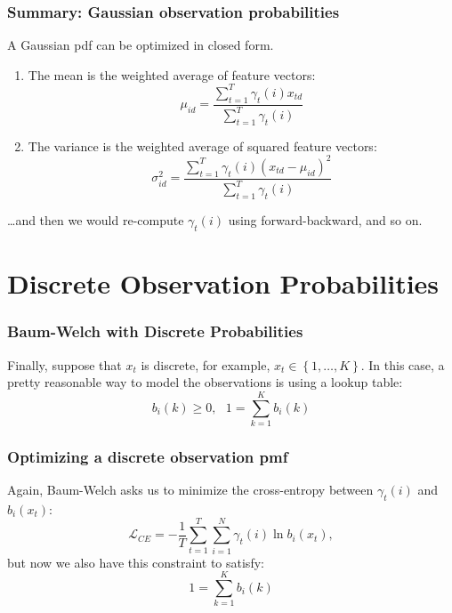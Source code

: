 \documentclass{beamer}
\begin{document}
\begin{frame}
  \frametitle{Summary: Gaussian observation probabilities}

  A Gaussian pdf can be optimized in closed form.
  \begin{enumerate}
  \item The mean is the weighted average of feature vectors:
    \begin{displaymath}
      \mu_{id} = \frac{\sum_{t=1}^T\gamma_t(i)x_{td}}{\sum_{t=1}^T\gamma_t(i)}
    \end{displaymath}
  \item The variance is the weighted average of squared feature vectors:
    \begin{displaymath}
      \sigma_{id}^2 = \frac{\sum_{t=1}^T\gamma_t(i)(x_{td}-\mu_{id})^2}{\sum_{t=1}^T\gamma_t(i)}
    \end{displaymath}
  \end{enumerate}
  \ldots and then we would re-compute $\gamma_t(i)$ using
  forward-backward, and so on.
\end{frame}

\section[Discrete]{Discrete Observation Probabilities}
\setcounter{subsection}{1}

\begin{frame}
  \frametitle{Baum-Welch with Discrete Probabilities}

  Finally, suppose that $x_t$ is discrete, for example,
  $x_t\in\left\{1,\ldots,K\right\}$.  In this case, a pretty
  reasonable way to model the observations is using a lookup table:
  \begin{displaymath}
  b_i(k)\ge 0,~~~1=\sum_{k=1}^K b_i(k)
  \end{displaymath}
\end{frame}

\begin{frame}
  \frametitle{Optimizing a discrete observation pmf}
  
  Again, Baum-Welch asks us to minimize the
  cross-entropy between $\gamma_t(i)$ and $b_i(x_t)$:
  \begin{displaymath}
    {\mathcal L}_{CE} = -\frac{1}{T}\sum_{t=1}^T\sum_{i=1}^N\gamma_t(i)\ln b_i(x_t),
  \end{displaymath}
  but now we also have this constraint to satisfy:
  \begin{displaymath}
    1=\sum_{k=1}^K b_i(k)
  \end{displaymath}
\end{frame}
  
\end{document}
